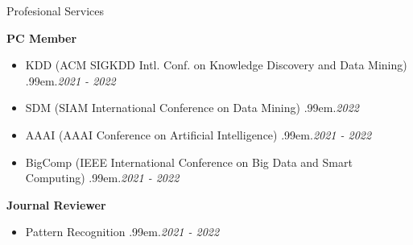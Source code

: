 \documentclass{resume} %
\makeatletter
\newcommand \Dotfill {\leavevmode \cleaders \hb@xt@ .99em{\hss .\hss }\hfill \kern \z@}
\makeatother
\begin{document}
\begin{rSection}{Profesional Services}

\textbf{PC Member}
\begin{itemize}[noitemsep]
	\item KDD {\small (ACM SIGKDD Intl. Conf. on Knowledge Discovery and Data Mining)} \smallskip \Dotfill \emph{2021 - 2022}
	\item SDM {\small (SIAM International Conference on Data Mining)} \smallskip \Dotfill \emph{2022}
	\item AAAI {\small (AAAI Conference on Artificial Intelligence)} \smallskip \Dotfill \emph{2021 - 2022}
	\item BigComp {\small (IEEE International Conference on Big Data and Smart Computing)} \smallskip \Dotfill \emph{2021 - 2022}
\end{itemize}

\textbf{Journal Reviewer}
\begin{itemize}[noitemsep]
	\item Pattern Recognition \smallskip \Dotfill \emph{2021 - 2022}
\end{itemize}


\end{rSection}

\end{document}
